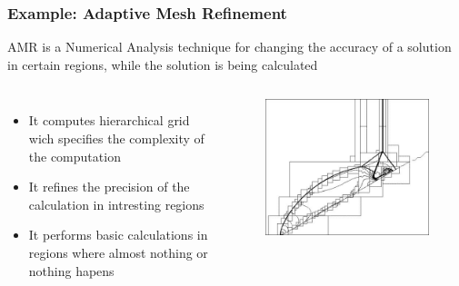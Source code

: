 \documentclass{beamer}\usetheme{Madrid} %
\begin{document}
\begin{frame}
  \frametitle {Example: Adaptive Mesh Refinement} AMR is a Numerical Analysis technique for changing the accuracy
		of a solution in certain regions, while the solution is being calculated
   \begin{columns}
    \begin{itemize}
		\item 
			It computes hierarchical grid wich specifies the complexity
			of the computation
		\item
			It refines the precision of the calculation in intresting
			regions
		\item
			It performs basic calculations in regions where almost nothing
			or nothing hapens
    \end{itemize}
    \begin{figure}
        \includegraphics[scale=0.32]{img/Amrgridimg2.jpg}
    \end{figure}
		\end{columns}
\end{frame}
\end{document}
